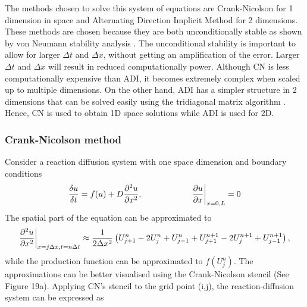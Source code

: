The methods chosen to solve this system of equations are Crank-Nicolson for 1 dimension in space and Alternating Direction Implicit Method for 2 dimensions. These methods are chosen because they are both unconditionally stable as shown by von Neumann stability analysis \parencite{strikwerda2004finite}. The unconditional stability is important to allow for larger $\Delta t$ and $\Delta x$, without getting an amplification of the error. Larger $\Delta t$ and $\Delta x$ will result in reduced computationally power. Although CN is less computationally expensive than ADI, it becomes extremely complex when scaled up to multiple dimensions. On the other hand, ADI has a simpler structure in 2 dimensions that can be solved easily using the tridiagonal matrix algorithm \parencite{Flaherty}. Hence, CN is used to obtain 1D space solutions while ADI is used for 2D.
\subsubsection{Crank-Nicolson method}
Consider a reaction diffusion system with one space dimension and boundary conditions
\begin{equation}
    \frac{\delta u}{\delta t} =  f(u) + D\pdv[2]{u}{x},   \quad \quad \quad \quad \quad \quad \pdv{u}{x}\biggr\rvert_{x=0,L}=0
\end{equation}
The spatial part of the equation can be approximated to
\begin{equation}
    \pdv[2]{u}{x} \biggr\rvert_{x=j\Delta x,t=n\Delta t} \approx \frac{1}{2\Delta x^{2}}\left( U^{n}_{j+1} -  2U^{n}_{j} + U^{n}_{j-1} + U^{n+1}_{j+1} - 2U^{n+1}_{j} + U^{n+1}_{j-1}\right),
\end{equation}
while the production function can be approximated to $f ( U^{n}_{j})$.  The approximations can be better visualised using the Crank-Nicolson stencil (See Figure 19a). Applying CN's stencil to the grid point (i,j), the reaction-diffusion system can be expressed as

